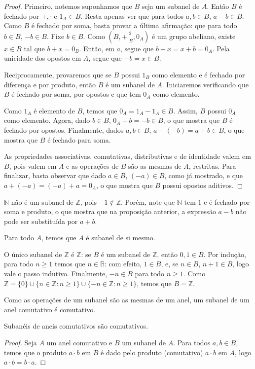 \begin{proof}
    Primeiro, notemos suponhamos que $B$ seja um subanel de $A$. Então $B$ é fechado por $+, \cdot$ e $1_A\in B$. Resta apenas ver que para todos $a, b \in B$, $a-b \in B$.
    Como $B$ é fechado por soma, basta provar a última afirmação: que para todo $b \in B$, $-b \in B$.
    Fixe $b \in B$. Como $(B, +|_B^2, 0_A)$ é um grupo abeliano, existe $x \in B$ tal que $b+x=0_B$. Então, em $a$, segue que $b+x=x+b=0_A$. Pela unicidade dos opostos em $A$, segue que $-b=x\in B$.

    Reciprocamente, provaremos que se $B$ possui $1_B$ como elemento e é fechado por diferença e por produto, então $B$ é um subanel de $A$. Iniciaremos verificando que $B$ é fechado por soma, por opostos e que tem $0_A$ como elemento.

    Como $1_A$ é elemento de $B$, temos que $0_A=1_A-1_A\in B$. Assim, $B$ possui $0_A$ como elemento. Agora, dado $b \in B$, $0_A-b=-b \in B$, o que mostra que $B$ é fechado por opostos. Finalmente, dados $a, b \in B$, $a-(-b)=a+b\in B$, o que mostra que $B$ é fechado para soma.

    As propriedades associativas, comutativas, distributivas e de identidade valem em $B$, pois valem em $A$ e as operações de $B$ são as mesmas de $A$, restritas. Para finalizar, basta observar que dado $a \in B$, $(-a)\in B$, como já mostrado, e que $a+(-a)=(-a)+a=0_A$, o que mostra que $B$ possui opostos aditivos.
\end{proof}

\begin{exemplo}
$\mathbb N$ não é um subanel de $\mathbb Z$, pois $-1 \notin \mathbb Z$.
Porém, note que $\mathbb N$ tem $1$ e é fechado por soma e produto, o que mostra que na proposição anterior, a expressão $a-b$ não pode ser substituída por $a+b$.
\end{exemplo}

\begin{exemplo}
    Para todo $A$, temos que $A$ é subanel de si mesmo.
\end{exemplo}

\begin{exemplo}
O único subanel de $\mathbb Z$ é $\mathbb Z$: se $B$ é um subanel de $\mathbb Z$, então $0, 1 \in B$.
Por indução, para todo $n\geq 1$ temos que $n \in \mathbb B$: com efeito, $1\in B$, e, se $n \in B$, $n+1\in B$, logo vale o passo indutivo. Finalmente, $-n\in B$ para todo $n\geq 1$. Como $\mathbb Z=\{0\}\cup\{n \in \mathbb Z: n\geq 1\}\cup \{-n \in \mathbb Z: n\geq 1\}$, temos que $B=\mathbb Z$.
\end{exemplo}

Como as operações de um subanel são as mesmas de um anel, um subanel de um anel comutativo é comutativo.

\begin{prop}
    Subanéis de aneis comutativos são comutativos.
\end{prop}
\begin{proof}
Seja $A$ um anel comutativo e $B$ um subanel de $A$. Para todos $a, b \in B$, temos que o produto $a\cdot b$ em $B$ é dado pelo produto (comutativo) $a\cdot b$ em $A$, logo $a\cdot b=b\cdot a$.
\end{proof}
